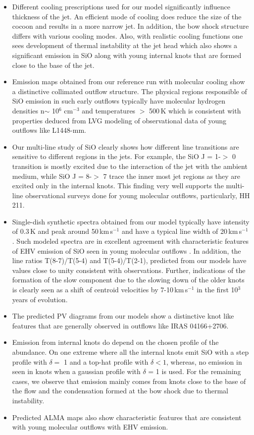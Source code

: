 \documentclass[useAMS,usenatbib]{mn2e}
\begin{document}
\begin{itemize}
\item Different cooling prescriptions used for our model
  significantly influence thickness of the jet. An
  efficient mode of cooling does reduce the size of the cocoon and results
  in a more narrow jet. In addition, the bow shock structure
  differs with various cooling modes. Also, with realistic cooling
  functions one sees development of
  thermal instability at the jet head which also shows a significant emission in SiO
  along with young internal knots that are formed close to the base of
  the jet.
\item Emission maps obtained from our reference run with molecular
  cooling show a distinctive collimated outflow structure. The
  physical regions responsible of SiO emission in such early outflows
  typically have molecular hydrogen densities n$\sim$ 10$^{6}$
  cm$^{-3}$ and temperatures $>$ 500\,K which is consistent with
  properties deduced from LVG modeling of observational data of
  young outflows like L1448-mm.
\item Our multi-line study of SiO clearly shows how different
  line transitions are sensitive to different regions in the jets. For
  example, the SiO J = 1-$>$ 0 transition is mostly excited due to
  the interaction of the jet with the ambient medium, while SiO J = 8-$>$ 7 trace the inner most jet regions as
  they are excited only in the internal knots. This finding very well
  supports the multi-line observational surveys done for young
  molecular outflows, particularly, HH 211.
\item Single-dish synthetic spectra obtained from our model typically
  have intensity of 0.3\,K and peak around 50\,km\,s$^{-1}$ and have a
  typical line width of 20\,km\,s$^{-1}$. Such modeled spectra are in
  excellent agreement with characteristic features of EHV emission of
  SiO seen in young molecular outflows . In addition, the line ratios 
  T(8-7)/T(5-4) and T(5-4)/T(2-1), predicted from our models have values close to
  unity consistent with observations. Further,
  indications of the formation of the slow component due to the
  slowing down of the
  older knots is clearly seen as a shift of centroid velocities by
  7-10\,km\,s$^{-1}$ in the first 10$^{3}$ years of evolution.
\item The predicted PV diagrams from our models show a distinctive
  knot like features that are generally observed in outflows like IRAS
  04166+2706.
\item Emission from internal knots do depend on the chosen profile of
  the abundance. On one extreme where all the internal knots emit SiO  
  with a step profile with $\delta =$ 1 and a top-hat profile with
  $\delta < 1$, whereas, no emission in
  seen in knots when a gaussian profile with $\delta$ = 1 is used. For
  the remaining cases, we observe that emission mainly
  comes from knots close to the base of the flow and the condensation
  formed at the bow shock due to thermal instability.
\item Predicted ALMA maps also show characteristic features that are
  consistent with young molecular outflows with EHV emission. 
\end{itemize}
\end{document}
